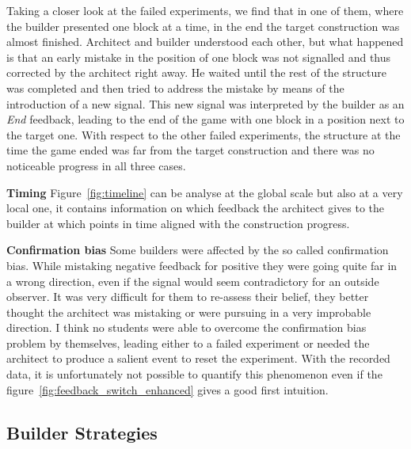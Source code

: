 {Taking a closer look at the failed experiments, we find that in one of them, where the builder presented one block at a time, in the end the target construction was almost finished. Architect and builder understood each other, but what happened is that an early mistake in the position of one block was not signalled and thus corrected by the architect right away. He waited until the rest of the structure was completed and then tried to address the mistake by means of the introduction of a new signal. This new signal was interpreted by the builder as an \emph{End} feedback, leading to the end of the game with one block in a position next to the target one. With respect to the other failed experiments, the structure at the time the game ended was far from the target construction and there was no noticeable progress in all three cases.



\textbf{Timing} Figure~\ref{fig:timeline} can be analyse at the global scale but also at a very local one, it contains information on which feedback the architect gives to the builder at which points in time aligned with the construction progress. 

\textbf{Confirmation bias} Some builders were affected by the so called confirmation bias. While mistaking negative feedback for positive they were going quite far in a wrong direction, even if the signal would seem contradictory for an outside observer. It was very difficult for them to re-assess their belief, they better thought the architect was mistaking or were pursuing in a very improbable direction. I think no students were able to overcome the confirmation bias problem by themselves, leading either to a failed experiment or needed the architect to produce a salient event to reset the experiment. With the recorded data, it is unfortunately not possible to quantify this phenomenon even if the figure~\ref{fig:feedback_switch_enhanced} gives a good first intuition.

\subsection{Builder Strategies}

}
